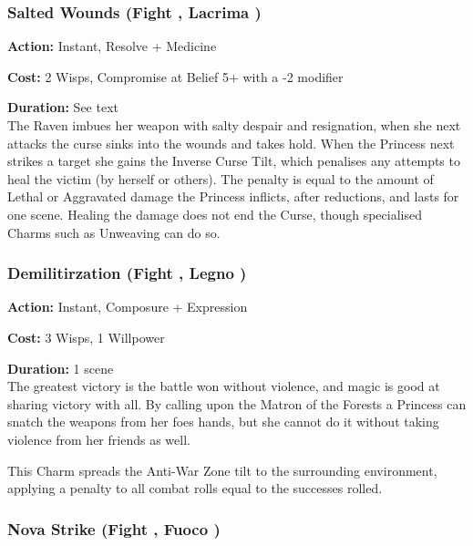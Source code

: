 \subsubsection*{Salted Wounds (Fight \textbullet\textbullet\textbullet, Lacrima \textbullet\textbullet\textbullet)}

\noindent \textbf{Action:} Instant, Resolve + Medicine

\noindent \textbf{Cost:} 2 Wisps, Compromise at Belief 5+ with a -2 modifier

\noindent \textbf{Duration:} See text\\

\noindent The Raven imbues her weapon with salty despair and resignation, when she next attacks the curse sinks into the wounds and takes hold. When the Princess next strikes a target she gains the Inverse Curse Tilt, which penalises any attempts to heal the victim (by herself or others). The penalty is equal to the amount of Lethal or Aggravated damage the Princess inflicts, after reductions, and lasts for one scene. Healing the damage does not end the Curse, though specialised Charms such as Unweaving can do so.

\subsubsection*{Demilitirzation (Fight \textbullet\textbullet\textbullet\textbullet, Legno \textbullet\textbullet\textbullet)}

\noindent \textbf{Action:} Instant, Composure + Expression

\noindent \textbf{Cost:} 3 Wisps, 1 Willpower

\noindent \textbf{Duration:} 1 scene\\

\noindent The greatest victory is the battle won without violence, and magic is good at sharing victory with all. By calling upon the Matron of the Forests a Princess can snatch the weapons from her foes hands, but she cannot do it without taking violence from her friends as well. 

This Charm spreads the Anti-War Zone tilt to the surrounding environment, applying a penalty to all combat rolls equal to the successes rolled. 

\subsubsection*{Nova Strike	(Fight \textbullet\textbullet\textbullet\textbullet\textbullet, Fuoco \textbullet\textbullet\textbullet\textbullet)}

